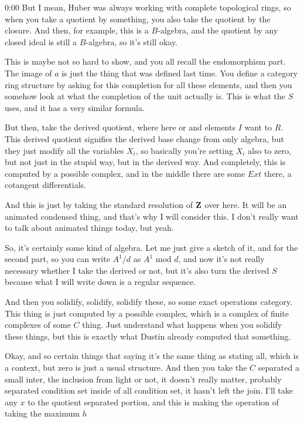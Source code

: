 \begin{unfinished}{0:00}
But I mean, Huber was always working with complete topological rings, so when you take a quotient by something, you also take the quotient by the closure. And then, for example, this is a $B$-algebra, and the quotient by any closed ideal is still a $B$-algebra, so it's still okay.

This is maybe not so hard to show, and you all recall the endomorphism part. The image of $a$ is just the thing that was defined last time. You define a category ring structure by asking for this completion for all these elements, and then you somehow look at what the completion of the unit actually is. This is what the $S$ uses, and it has a very similar formula.

But then, take the derived quotient, where here or and elements $I$ want to $R$. This derived quotient signifies the derived base change from only algebra, but they just modify all the variables $X_i$, so basically you're setting $X_i$ also to zero, but not just in the stupid way, but in the derived way. And completely, this is computed by a possible complex, and in the middle there are some $Ext$ there, a cotangent differentials.

And this is just by taking the standard resolution of $\mathbf Z$ over here. It will be an animated condensed thing, and that's why I will consider this. I don't really want to talk about animated things today, but yeah.

So, it's certainly some kind of algebra. Let me just give a sketch of it, and for the second part, so you can write $A^1/d$ as $A^1$ mod $d$, and now it's not really necessary whether I take the derived or not, but it's also turn the derived $S$ because what I will write down is a regular sequence.

And then you solidify, solidify, solidify these, so some exact operations category. This thing is just computed by a possible complex, which is a complex of finite complexes of some $C$ thing. Just understand what happens when you solidify these things, but this is exactly what Dustin already computed that something.

Okay, and so certain things that saying it's the same thing as stating all, which is a context, but zero is just a usual structure. And then you take the $C$ separated a small inter, the inclusion from light or not, it doesn't really matter, probably separated condition set inside of all condition set, it hasn't left the join. I'll take any $x$ to the quotient separated portion, and this is making the operation of taking the maximum $h$


\end{unfinished}
